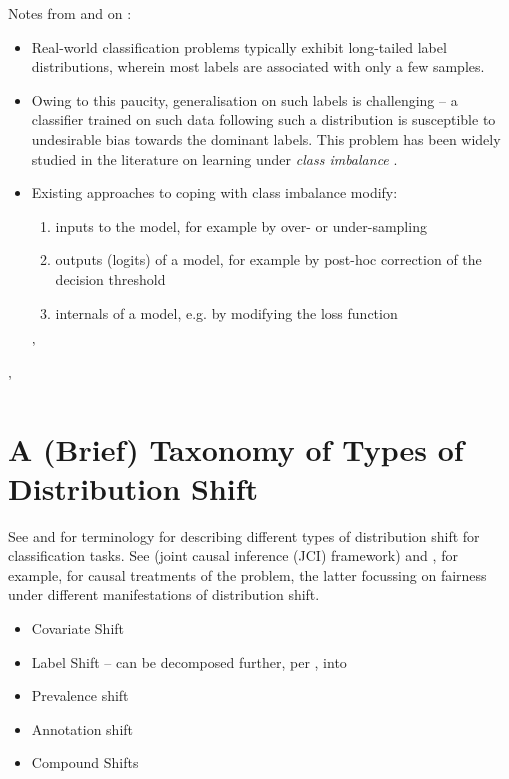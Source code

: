 Notes from and on \cite{menon2020long}:
%
\begin{itemize}
        \item Real-world classification problems typically exhibit long-tailed label distributions,
          wherein most labels are associated with only a few samples.
        \item Owing to this paucity, generalisation on such labels is challenging -- a classifier
          trained on such data following such a distribution is susceptible to undesirable bias
          towards the dominant labels. 
          This problem has been widely studied in the literature on learning under \emph{class
          imbalance} \citep{cardie1997improving}.
        \item 
          Existing approaches to coping with class imbalance modify: 
          \begin{enumerate}
            \item inputs to the model, for example by over- or under-sampling
              \citep{kubat1997addressing, chawla2002smote} \item outputs (logits) of a model, for
              example by post-hoc correction of the decision threshold \citep{fawcett1996combining}
            \item internals of a model, e.g. by modifying the loss function 
          \end{enumerate}'

\end{itemize}'


\section{A (Brief) Taxonomy of Types of Distribution Shift}

See \cite{moreno2012unifying} and \cite{castro2020causality} for terminology for describing
different types of distribution shift for classification tasks. 
%
See \cite{mooij2020joint} (joint causal inference (JCI) framework) and \cite{schrouffdiagnosing},
for example, for causal treatments of the problem, the latter focussing on fairness under different
manifestations of distribution shift.
%
\itemi\begin{itemize}
        \item Covariate Shift
        \item Label Shift -- can be decomposed further, per \cite{castro2020causality}, into
          \item Prevalence shift
          \item Annotation shift
        \item Compound Shifts
\end{itemize}

